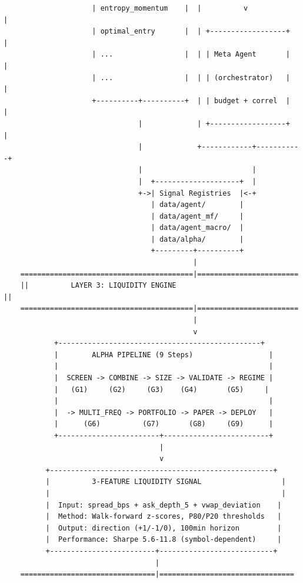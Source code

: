 \documentclass[11pt,a4paper]{article}
\begin{document}
{\begin{verbatim}
                     | entropy_momentum    |  |          v             |
                     | optimal_entry       |  | +------------------+   |
                     | ...                 |  | | Meta Agent       |   |
                     | ...                 |  | | (orchestrator)   |   |
                     +----------+----------+  | | budget + correl  |   |
                                |             | +------------------+   |
                                |             +------------+-----------+
                                |                          |
                                |  +--------------------+  |
                                +->| Signal Registries  |<-+
                                   | data/agent/        |
                                   | data/agent_mf/     |
                                   | data/agent_macro/  |
                                   | data/alpha/        |
                                   +---------+----------+
                                             |
    =========================================|========================
    ||          LAYER 3: LIQUIDITY ENGINE                            ||
    =========================================|========================
                                             |
                                             v
            +------------------------------------------------+
            |        ALPHA PIPELINE (9 Steps)                  |
            |                                                  |
            |  SCREEN -> COMBINE -> SIZE -> VALIDATE -> REGIME |
            |   (G1)     (G2)     (G3)    (G4)       (G5)     |
            |                                                  |
            |  -> MULTI_FREQ -> PORTFOLIO -> PAPER -> DEPLOY   |
            |      (G6)          (G7)       (G8)     (G9)      |
            +------------------------+-------------------------+
                                     |
                                     v
          +-----------------------------------------------------+
          |          3-FEATURE LIQUIDITY SIGNAL                   |
          |                                                       |
          |  Input: spread_bps + ask_depth_5 + vwap_deviation    |
          |  Method: Walk-forward z-scores, P80/P20 thresholds   |
          |  Output: direction (+1/-1/0), 100min horizon         |
          |  Performance: Sharpe 5.6-11.8 (symbol-dependent)     |
          +-------------------------+---------------------------+
                                    |
    ================================|================================

\end{verbatim}}
\end{document}
